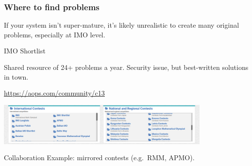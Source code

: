 \documentclass[11pt]{beamer}
\begin{document}
\begin{frame}
  \frametitle{Where to find problems}
  If your system isn't super-mature, it's likely
  unrealistic to create many original problems, especially at IMO level.

  \begin{alertblock}{IMO Shortlist}
    \begin{itemize}
      \ii Shared resource of 24+ problems a year.
      \ii Security issue, but best-written solutions in town.
    \end{itemize}
  \end{alertblock}

  \pause

  \begin{block}{\url{https://aops.com/community/c13}}
    \begin{center}
      \includegraphics[width=0.8\textwidth]{contest-index.png}
    \end{center}
  \end{block}

  \pause

  \begin{exampleblock}{Collaboration}
    Example: mirrored contests (e.g.\ RMM, APMO).
  \end{exampleblock}
\end{frame}
\end{document}
